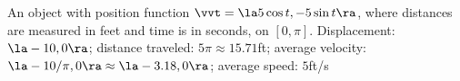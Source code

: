 {An object with position function $\vvt = \la 5\cos t,-5\sin t\ra$, where distances are measured in feet and time is in seconds, on $[0,\pi]$.
}
{Displacement: $\la -10,0\ra$; distance traveled: $5\pi \approx 15.71$ft; average velocity: $\la -10/\pi,0\ra\approx \la -3.18,0\ra$; average speed: $5$ft/s
}